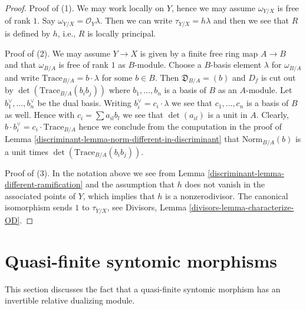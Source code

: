 \begin{proof}

Proof of (1). We may work locally on $Y$, hence we may assume
$\omega_{Y/X}$ is free of rank $1$. Say $\omega_{Y/X} = \mathcal{O}_Y\lambda$.
Then we can write $\tau_{Y/X} = h \lambda$ and then we see that
$R$ is defined by $h$, i.e., $R$ is locally principal.

\medskip\noindent
Proof of (2). We may assume $Y \to X$ is given by a finite free ring
map $A \to B$ and that $\omega_{B/A}$ is free of rank $1$ as $B$-module.
Choose a $B$-basis element $\lambda$ for $\omega_{B/A}$ and write
$\text{Trace}_{B/A} = b \cdot \lambda$ for some $b \in B$.
Then $\mathfrak{D}_{B/A} = (b)$ and $D_f$ is cut out by
$\det(\text{Trace}_{B/A}(b_ib_j))$ where $b_1, \ldots, b_n$ is a
basis of $B$ as an $A$-module. Let $b_1^\vee, \ldots, b_n^\vee$
be the dual basis.
Writing $b_i^\vee = c_i \cdot \lambda$ we see that
$c_1, \ldots, c_n$ is a basis of $B$ as well.
Hence with $c_i = \sum a_{il}b_l$ we see that $\det(a_{il})$
is a unit in $A$. Clearly,
$b \cdot b_i^\vee = c_i \cdot \text{Trace}_{B/A}$
hence we conclude from the computation in the proof of
Lemma \ref{discriminant-lemma-norm-different-in-discriminant}
that $\text{Norm}_{B/A}(b)$ is a unit times
$\det(\text{Trace}_{B/A}(b_ib_j))$.

\medskip\noindent
Proof of (3). In the notation above we see from
Lemma \ref{discriminant-lemma-different-ramification} and the assumption
that $h$ does not vanish in
the associated points of $Y$, which implies that $h$ is a nonzerodivisor.
The canonical isomorphism sends $1$ to $\tau_{Y/X}$, see
Divisors, Lemma \ref{divisors-lemma-characterize-OD}.
\end{proof}

\section{Quasi-finite syntomic morphisms}
\label{discriminant-section-quasi-finite-syntomic}
This section discusses the fact that a quasi-finite syntomic morphism
has an invertible relative dualizing module.

